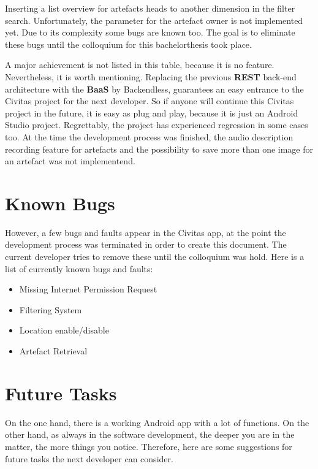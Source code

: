 Inserting a list overview for artefacts heads to another dimension in the filter search. Unfortunately, the parameter for the artefact owner is not implemented yet. Due to its complexity some bugs are known too. The goal is to eliminate these bugs until the colloquium for this bachelorthesis took place.

A major achievement is not listed in this table, because it is no feature. Nevertheless, it is worth mentioning. Replacing the previous \textbf{REST} back-end architecture with the \textbf{BaaS} by Backendless, guarantees an easy entrance to the Civitas project for the next developer. So if anyone will continue this Civitas project in the future, it is easy as plug and play, because it is just an Android Studio project.
Regrettably, the project has experienced regression in some cases too. At the time the development process was finished, the audio description recording feature for artefacts and the possibility to save more than one image for an artefact was not implementend. 

\section{Known Bugs}
However, a few bugs and faults appear in the Civitas app, at the point the development process was terminated in order to create this document. The current developer tries to remove these until the colloquium was hold. Here is a list of currently known bugs and faults:
\begin{itemize}
\item Missing Internet Permission Request
\item Filtering System
\item Location enable/disable
\item Artefact Retrieval
\end{itemize}

\section{Future Tasks}
On the one hand, there is a working Android app with a lot of functions. On the other hand, as always in the software development, the deeper you are in the matter, the more things you notice. Therefore, here are some suggestions for future tasks the next developer can consider.

